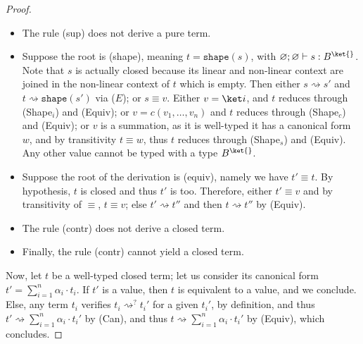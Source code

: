 \documentclass[10pt,a4paper]{article}
\newcommand{\bvar}{B}
\newcommand\bkvar{\bvar^{\ket{}}}
\newcommand{\nonlinfunc}{\Rightarrow}
\newcommand{\linfunc}{\multimap}
\newcommand{\textletrec}{\ensuremath{\mathtt{letrec}}}
\newcommand{\lbd}[2]{\lambda #1 .#2}
\newcommand{\letrec}[3]{\textletrec\,#1\,#2=#3}
\newcommand{\shape}[1]{\mathtt{shape}(#1)}
\newcommand{\typing}[4]{
  \ifx&#1&\varnothing \else #1\fi; 
  \ifx&#2&\varnothing \else #2\fi 
  \vdash {#3} : #4
}
\newcommand{\closedtyping}[2]{\typing{}{}{#1}{#2}}
\newcommand{\reduces}{\rightsquigarrow}
\newcommand{\evalcontext}{\ensuremath{E}}
\newcommand{\zoreduces}{\ensuremath{\reduces^?}}%
\begin{document}
\begin{proof}
\begin{itemize}
      type, then its canonical form
      consists of one pure term; as $v_1$ has the same canonical form
      by unicity, this term is a value too.
      Thus, $t_1 \equiv 1 \cdot v \equiv v$.
      Now, the only closed, well-typed values of type $C \nonlinfunc T$ or
      $T \linfunc T'$ are either $\lbd x t'$, and as $(\lbd x t')v_2
      \reduces \sigma(t')$
      via (Lbd), then $t \reduces \sigma(t')$ via (Equiv);
      or $\letrec f x t'$ and as $(\letrec f x t')v_2 \reduces \sigma(t')$
      via (Rec), then $t \reduces \sigma(t')$ via (Equiv).
    \item The rule (sup) does not derive a pure term.
    \item Suppose the root is (shape), meaning $t = \shape s$, with
      $\closedtyping{s}{\bkvar}$.
      Note that $s$ is actually closed because its linear and
      non-linear context are joined in the non-linear context of $t$
      which is empty.
      Then either $s \reduces s'$ and $t \reduces \shape{s'}$ via
      (\evalcontext); or $s \equiv v$.
      Either $v = \ket i$, and $t$ reduces through (Shape$_i$) and (Equiv);
      or $v = c(v_1, \dots, v_n)$ and $t$ reduces through (Shape$_c$)
      and (Equiv);
      or $v$ is a summation, as it is well-typed it has a canonical
      form $w$, and by transitivity $t \equiv w$, thus $t$ reduces
      through (Shape$_s$) and (Equiv).
      Any other value cannot be typed with a type $\bkvar$.
    \item Suppose the root of the derivation is (equiv), namely we
      have $t' \equiv t$.
      By hypothesis, $t$ is closed and thus $t'$ is too.
      Therefore, either $t' \equiv v$ and by transitivity of
      $\equiv$, $t \equiv v$; else $t' \reduces t''$ and then $t
      \reduces t''$ by (Equiv).
    \item The rule (contr) does not derive a closed term.
    \item Finally, the rule (contr) cannot yield a closed term.
  \end{itemize}

  Now, let $t$ be a well-typed closed term; let us consider its
  canonical form $t' = \sum_{i=1}^n \alpha_i \cdot t_i$.
  If $t'$ is a value, then $t$ is equivalent to a value, and we conclude.
  Else, any term $t_i$ verifies $t_i \zoreduces t_i'$ for a given
  $t_i'$, by definition, and thus $t' \reduces \sum_{i=1}^n \alpha_i
  \cdot t_i'$ by (Can), and thus $t \reduces \sum_{i=1}^n \alpha_i
  \cdot t_i'$ by (Equiv), which concludes. \qedhere
\end{proof}
\end{document}
